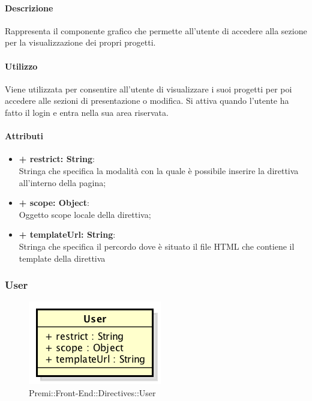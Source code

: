 	\paragraph{Descrizione}
	Rappresenta il componente grafico che permette all'utente di accedere alla sezione per la visualizzazione dei propri progetti.
	
	\paragraph{Utilizzo}
	Viene utilizzata per consentire all'utente di visualizzare i suoi progetti per poi accedere alle sezioni di presentazione o modifica. Si attiva quando l'utente ha fatto il login e entra nella sua area riservata.
	
	\paragraph{Attributi}
	\begin{itemize}
		\item \textbf{+ restrict: String}:\\
		Stringa che specifica la modalità con la quale è possibile inserire la direttiva all'interno della pagina;
		\item \textbf{+ scope: Object}:\\
		Oggetto scope locale della direttiva;
		\item \textbf{+ templateUrl: String}:\\
		Stringa che specifica il percordo dove è situato il file \gls{HTML} che contiene il \gls{template} della direttiva
	\end{itemize}
\newpage


\subsubsection{User}
	\begin{figure}[h]
		\centering
		\includegraphics[width=0.5\linewidth]{img/premi_front_end_directives_user}
		\caption[Premi::Front-End::Directives::User]{Premi::Front-End::Directives::User}
	\end{figure}
	
